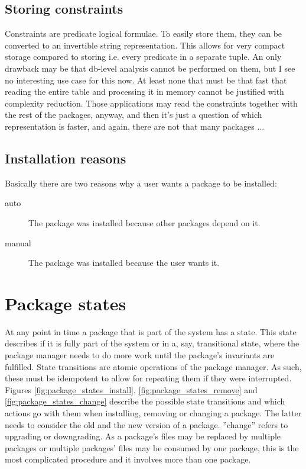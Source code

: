 \documentclass[a4paper]{scrartcl}
\begin{document}
	
	\subsection{Storing constraints}
	\label{ssec:storing_constraints}
	
	Constraints are predicate logical formulae. To easily store them, they can be converted to an invertible string representation. This allows for very compact storage compared to storing i.e. every predicate in a separate tuple. An only drawback may be that db-level analysis cannot be performed on them, but I see no interesting use case for this now. At least none that must be that fast that reading the entire table and processing it in memory cannot be justified with complexity reduction. Those applications may read the constraints together with the rest of the packages, anyway, and then it's just a question of which representation is faster, and again, there are not that many packages ...
	
	
	\subsection{Installation reasons}
	\label{ssec:installation_reasons}
	
	Basically there are two reasons why a user wants a package to be installed:
	
	\begin{description}
		\item[auto] The package was installed because other packages depend on it.
		\item[manual] The package was installed because the user wants it.
	\end{description}
	
	
	\section{Package states}
	\label{sec:package_states}
	
	At any point in time a package that is part of the system has a state. This state describes if it is fully part of the system or in a, say, transitional state, where the package manager needs to do more work until the package's invariants are fulfilled. State transitions are atomic operations of the package manager. As such, these must be idempotent to allow for repeating them if they were interrupted. Figures \ref{fig:package_states_install}, \ref{fig:package_states_remove} and \ref{fig:package_states_change} describe the possible state transitions and which actions go with them when installing, removing or changing a package. The latter needs to consider the old and the new version of a package. ''change'' refers to upgrading or downgrading. As a package's files may be replaced by multiple packages or multiple packages' files may be consumed by one package, this is the most complicated procedure and it involves more than one package.
	
\end{document}
